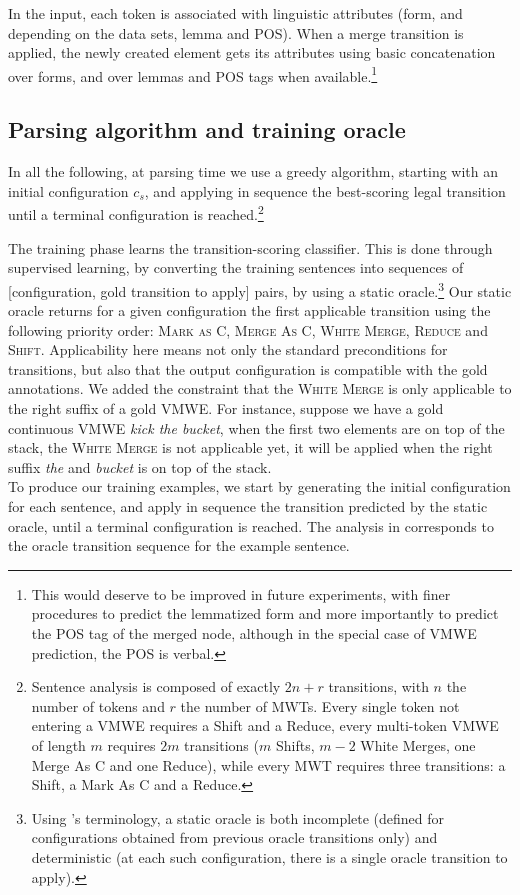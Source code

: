 \documentclass[output=paper,modfonts]{langscibook}
\begin{document}
In the input, each token is associated with linguistic attributes (form, and depending on the data sets, lemma and POS). When a merge transition is applied, the newly created element gets its attributes using basic concatenation over forms, and over lemmas and POS tags when available.\footnote{This would deserve to be improved in future experiments, with finer procedures to predict the lemmatized form and more importantly to predict the POS tag of the merged node, although in the special case of VMWE prediction, the POS is verbal.}
\subsection{Parsing algorithm and training oracle}
In all the following, at parsing time we use a greedy algorithm, starting with an initial configuration $c_s$, and applying in sequence the best-scoring legal transition until a terminal configuration is reached.\footnote{Sentence analysis is composed of exactly $2n + r$ transitions, with $n$ the number of tokens and $r$ the number of  MWTs. Every single token not entering a VMWE requires a Shift and a Reduce, every multi-token VMWE of length $m$ requires $2m$ transitions ($m$ Shifts, $m-2$ White Merges, one Merge As C and one Reduce), while every MWT requires three transitions: a Shift, a Mark As C and a Reduce.}

The training phase learns the transition-scoring classifier. This is done through supervised learning, by converting the training sentences into sequences of [configuration, gold transition to apply] pairs, by using a static oracle.\footnote{Using \citep{goldberg2013training}'s terminology, a static oracle is both incomplete (defined for configurations obtained from previous oracle transitions only) and deterministic (at each such configuration, there is a single oracle transition to apply).} Our static oracle returns for a given configuration the first applicable transition using the following priority order: \textsc{Mark as C, Merge As C, White Merge, Reduce} and \textsc{Shift}. Applicability here means not only the standard preconditions for transitions, but also that the output configuration is compatible with the gold annotations. We added the constraint that the {\textsc{White Merge}} is only applicable to the right suffix of a gold VMWE. For instance, suppose we have a gold continuous VMWE \textit{kick the bucket}, when the first two elements are on top of the stack, the \textsc{White Merge} is not applicable yet, it will be applied when the right suffix \textit{the} and \textit{bucket} is on top of the stack.\\
To produce our training examples, we start by generating the initial configuration for each sentence, and apply in sequence the transition predicted by the static oracle, until a terminal configuration is reached. 
The analysis in  corresponds to the oracle transition sequence for the example sentence.
\end{document}
